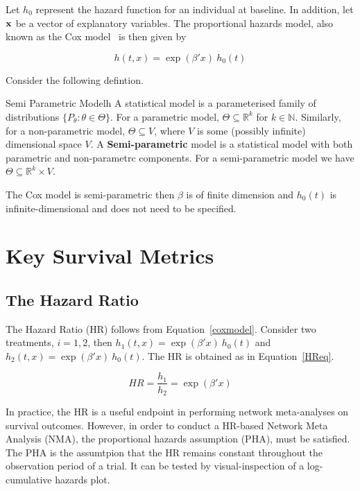 Let $h_0$ represent the hazard function for an individual at baseline. In addition, let $\bf{x}$ be a vector of explanatory variables. The proportional hazards model, also known as the Cox model~\cite{cox1972} is then given by 

\begin{equation}
    h(t, x) = \exp(\beta'x) \ h_0(t)
    \label{coxmodel}
\end{equation}

Consider the following defintion.

\begin{definition}{Semi Parametric Model}{h}
    A statistical model is a parameterised family of distributions $\{P_{\theta} : \theta \in \Theta\}$. 
    For a parametric model, $\Theta \subseteq \mathbb{R}^k$ for $k \in \mathbb{N}$. Similarly, for a non-parametric model, $\Theta \subseteq V$, where $V$ is some (possibly infinite) dimensional space $V$. A \textbf{Semi-parametric} model is a statistical model with both parametric and non-parametrc components. For a semi-parametric model we have $\Theta \subseteq \mathbb{R}^k \times V$.
\end{definition}

The Cox model is semi-parametric then $\beta$ is of finite dimension and $h_0(t)$ is infinite-dimensional and does not need to be specified. 

\section{Key Survival Metrics}

\subsection{The Hazard Ratio}
The Hazard Ratio (HR) follows from Equation~\ref{coxmodel}. Consider two treatments, $i = 1, 2$, then $h_1(t, x) = \exp(\beta'x) \ h_0(t)$ and $h_2(t, x) = \exp(\beta'x) \ h_0(t)$. The HR is obtained as in Equation~\ref{HReq}.

\begin{equation}
    HR = \frac{h_1}{h_2} = \exp(\beta' x)
    \label{HReq}
\end{equation}

In practice, the HR is a useful endpoint in performing network meta-analyses on survival outcomes. However, in order to conduct a HR-based Network Meta Analysis (NMA), the proportional hazards assumption (PHA), must be satisfied. The PHA is the assumtpion that the HR remains constant throughout the observation period of a trial. It can be tested by visual-inspection of a log-cumulative hazards plot. 

